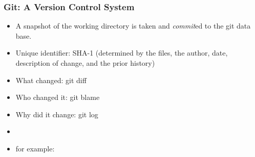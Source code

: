 \begin{frame}
  \frametitle{Git: A Version Control System}
  \begin{itemize}
    \item A snapshot of the working directory is taken and \emph{commit}ed to
      the git data base.
    \item Unique identifier: SHA-1 (determined by the files, the author, date,
      description of change, and the prior history)
    \item What changed: git diff
    \item Who changed it: git blame
    \item Why did it change: git log
    \item[]
    \item for example:
  \end{itemize}
\end{frame}
